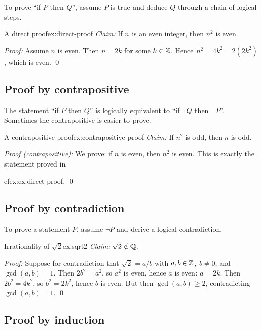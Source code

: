 To prove ``if $P$ then $Q$'', assume $P$ is true and deduce $Q$ through a
chain of logical steps.

\begin{example}{A direct proof}{ex:direct-proof}
\emph{Claim:} If $n$ is an even integer, then $n^2$ is even.

\emph{Proof:} Assume $n$ is even. Then $n=2k$ for some $k\in{\mathbb{Z}}$. Hence
$n^2 = 4k^2 = 2(2k^2)$, which is even. \qed
\end{example}

\subsection{Proof by contrapositive}\label{subsec:contrapositive}

The statement ``if $P$ then $Q$'' is logically equivalent to ``if
$\lnot Q$ then $\lnot P$''. Sometimes the contrapositive is easier to
prove.

\begin{example}{A contrapositive proof}{ex:contrapositive-proof}
\emph{Claim:} If $n^2$ is odd, then $n$ is odd.

\emph{Proof (contrapositive):} We prove: if $n$ is even, then $n^2$ is
even. This is exactly the statement proved in

ef{ex:ex:direct-proof}. \qed
\end{example}

\subsection{Proof by contradiction}\label{subsec:contradiction}

To prove a statement $P$, assume $\lnot P$ and derive a logical
contradiction.

\begin{example}{Irrationality of $\sqrt{2}$}{ex:sqrt2}
\emph{Claim:} $\sqrt{2}\notin{\mathbb{Q}}$.

\emph{Proof:} Suppose for contradiction that $\sqrt{2}=a/b$ with
$a,b\in{\mathbb{Z}}$, $b\neq 0$, and $\gcd(a,b)=1$. Then $2b^2=a^2$, so $a^2$ is
even, hence $a$ is even: $a=2k$. Then $2b^2=4k^2$, so $b^2=2k^2$, hence
$b$ is even. But then $\gcd(a,b)\geq 2$, contradicting
$\gcd(a,b)=1$. \qed
\end{example}

\subsection{Proof by induction}\label{subsec:induction}

